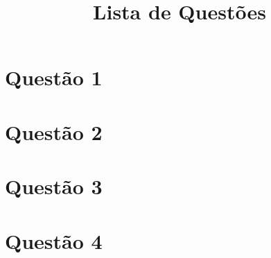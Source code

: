 \documentclass[a4paper,12pt]{article}
\title{Lista de Questões}
\author{}
\date{} %
\begin{document}

\begin{multicols}{2}
\section*{Questão 1}
\lipsum[1]

\section*{Questão 2}
\lipsum[2]

\section*{Questão 3}
\lipsum[3]

\section*{Questão 4}
\lipsum[4]
\end{multicols}
\end{document}

